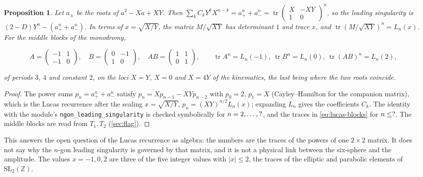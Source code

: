 \documentclass[11pt,a4paper]{article}
\newcommand{\ZZ}{\mathbb{Z}}
\newcommand{\SL}{\mathrm{SL}}
\theoremstyle{plain}
\newtheorem{proposition}{Proposition}
\theoremstyle{definition}
\begin{document}
\begin{proposition}
\label{prop:surf-lucas}
Let $a_\pm$ be the roots of $a^2-Xa+XY$. Then $\sum_kC_kY^kX^{n-k}=a_+^n+a_-^n=\operatorname{tr}\begin{pmatrix}X&-XY\\1&0\end{pmatrix}^n$, so the
leading singularity is $(2-D)Y^n-(a_+^n+a_-^n)$. In terms of $x=\sqrt{X/Y}$, the matrix $M/\sqrt{XY}$ has determinant $1$ and trace $x$,
and $\operatorname{tr}(M/\sqrt{XY})^n=L_n(x)$. For the middle blocks of the monodromy,
\begin{footnotesize}
\begin{equation}
  A=\begin{pmatrix}-1&1\\-1&0\end{pmatrix},\quad B=\begin{pmatrix}0&-1\\1&0\end{pmatrix},\quad AB=\begin{pmatrix}1&1\\0&1\end{pmatrix},
	\qquad
  \operatorname{tr}A^n=L_n(-1),\ \operatorname{tr}B^n=L_n(0),\ \operatorname{tr}(AB)^n=L_n(2),
  \label{eq:lucas-blocks}
\end{equation}
\end{footnotesize}

of periods $3$, $4$ and constant $2$, on the loci $X=Y$, $X=0$ and $X=4Y$ of the kinematics, the last being where the two roots coincide.
\end{proposition}

\begin{proof}
The power sums $p_n=a_+^n+a_-^n$ satisfy $p_n=Xp_{n-1}-XYp_{n-2}$ with $p_0=2$, $p_1=X$ (Cayley--Hamilton for the companion matrix), which is the Lucas
recurrence after the scaling $x=\sqrt{X/Y}$, $p_n=(XY)^{n/2}L_n(x)$; expanding $L_n$ gives the coefficients $C_k$. The identity with the
module's \texttt{ngon\_leading\_singularity} is checked symbolically for $n=2,\dots,?$, and the traces in \eqref{eq:lucas-blocks} for $n\le?$.
The middle blocks are read from $T_1,T_2$ (\cref{sec:flag}).
\end{proof}

This answers the open question of the Lucas recurrence as algebra: the numbers are the traces of the powers of one $2\times2$ matrix. It does not say why the
$n$-gon leading singularity is governed by that matrix, and it is not a physical link between the six-sphere and the amplitude. The values $x=-1,0,2$ are three of the five integer
values with $|x|\le2$, the traces of the elliptic and parabolic elements of $\SL_2(\ZZ)$.
\end{document}
